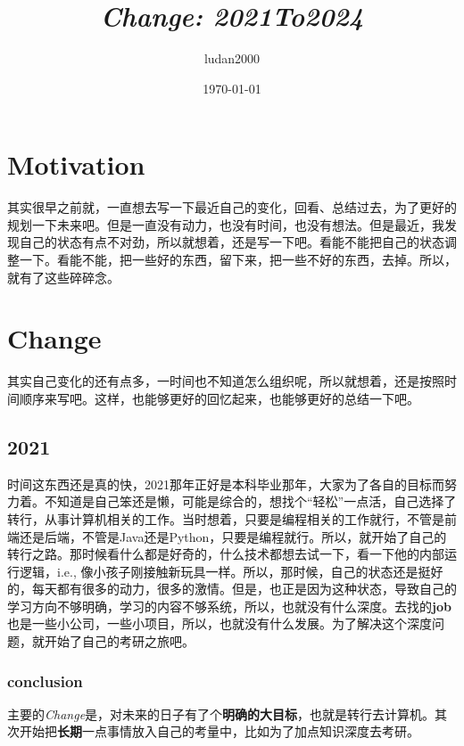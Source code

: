 \documentclass{article}
\title{\textit{Change: 2021To2024}}
\author{ludan2000}
\date{\today}
\begin{document}
\maketitle
\section{Motivation}
其实很早之前就，一直想去写一下最近自己的变化，回看、总结过去，为了更好的规划一下未来吧。但是一直没有动力，也没有时间，也没有想法。但是最近，我发现自己的状态有点不对劲，所以就想着，还是写一下吧。看能不能把自己的状态调整一下。看能不能，把一些好的东西，留下来，把一些不好的东西，去掉。所以，就有了这些碎碎念。

\section{Change}
其实自己变化的还有点多，一时间也不知道怎么组织呢，所以就想着，还是按照时间顺序来写吧。这样，也能够更好的回忆起来，也能够更好的总结一下吧。
\subsection{2021}
时间这东西还是真的快，2021那年正好是本科毕业那年，大家为了各自的目标而努力着。不知道是自己笨还是懒，可能是综合的，想找个“轻松”一点活，自己选择了转行，从事计算机相关的工作。当时想着，只要是编程相关的工作就行，不管是前端还是后端，不管是Java还是Python，只要是编程就行。所以，就开始了自己的转行之路。那时候看什么都是好奇的，什么技术都想去试一下，看一下他的内部运行逻辑，i.e., 像小孩子刚接触新玩具一样。所以，那时候，自己的状态还是挺好的，每天都有很多的动力，很多的激情。但是，也正是因为这种状态，导致自己的学习方向不够明确，学习的内容不够系统，所以，也就没有什么深度。去找的\textbf{job}也是一些小公司，一些小项目，所以，也就没有什么发展。为了解决这个深度问题，就开始了自己的考研之旅吧。
\subsubsection*{conclusion}
主要的\textit{Change}是，对未来的日子有了个\textbf{明确的大目标}，也就是转行去计算机。其次开始把\textbf{长期}一点事情放入自己的考量中，比如为了加点知识深度去考研。
\end{document}
